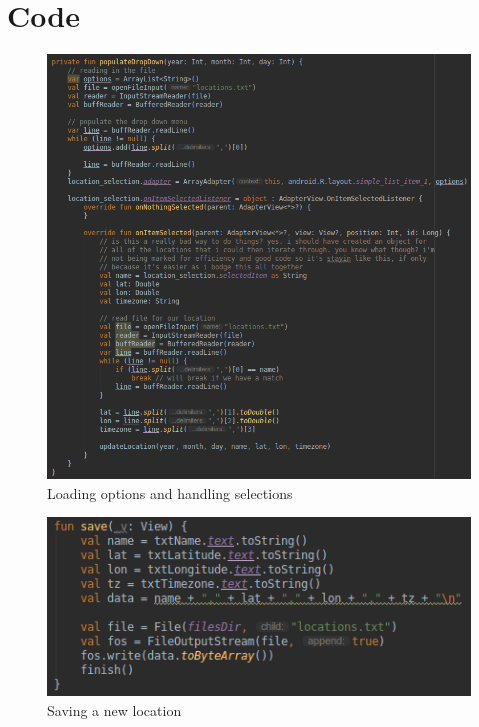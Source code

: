 \documentclass{scrartcl}
\begin{document}
\section*{Code}
\begin{figure}[h]
    \centering
    \includegraphics[scale=0.5]{images/code1.png}
    \caption{Loading options and handling selections}
\end{figure}

\begin{figure}[h]
    \centering
    \includegraphics[scale=0.8]{images/code2.png}
    \caption{Saving a new location}
\end{figure}
\end{document}
